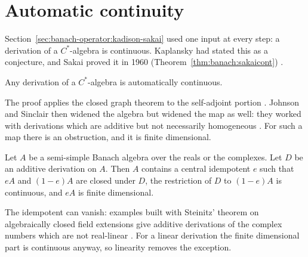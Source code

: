 \section{Automatic continuity}\label{sec:banach-operator:automatic-continuity}

Section~\ref{sec:banach-operator:kadison-sakai} used one input at every
step: a derivation of a $C^*$-algebra is continuous. Kaplansky had
stated this as a conjecture, and Sakai proved it in 1960 (Theorem~\ref{thm:banach:sakaicont})
\cite[p.~31]{Sakai1960Kaplansky}.\begin{theorem}\label{thm:banach:sakaicont}
Any derivation of a $C^*$-algebra is automatically continuous.
\end{theorem}

The proof applies the closed graph theorem to the self-adjoint portion
\cite[p.~31]{Sakai1960Kaplansky}. Johnson and Sinclair then widened the
algebra but widened the map as well: they worked with derivations which
are additive but not necessarily homogeneous
\cite[p.~1067]{JohnsonSinclair1968}. For such a map there is an
obstruction, and it is finite dimensional.

\begin{theorem}\label{thm:banach:js}
Let $A$ be a semi-simple Banach algebra over the reals or the complexes.
Let $D$ be an additive derivation on $A$. Then $A$ contains a central
idempotent $e$ such that $eA$ and $(1-e)A$ are closed under $D$, the
restriction of $D$ to $(1-e)A$ is continuous, and $eA$ is finite
dimensional.
\end{theorem}

The idempotent can vanish: examples built with Steinitz' theorem on
algebraically closed field extensions give additive derivations of the
complex numbers which are not real-linear
\cite[p.~1072]{JohnsonSinclair1968}. For a linear derivation the finite
dimensional part is continuous anyway, so linearity removes the exception.


